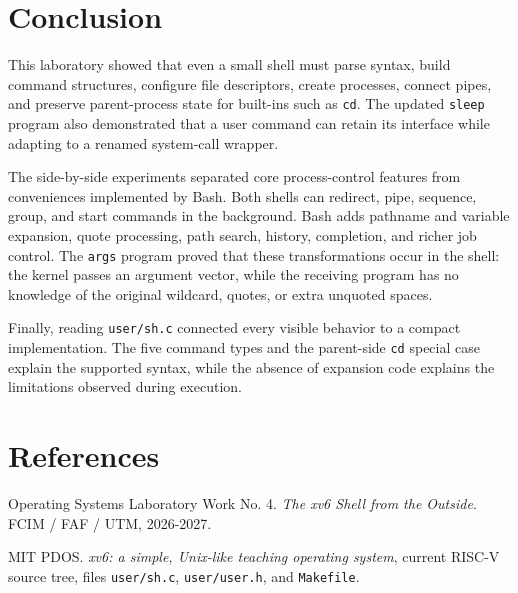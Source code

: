 \documentclass[12pt,a4paper]{article}
\begin{document}
\section*{Conclusion}

This laboratory showed that even a small shell must parse syntax, build command structures, configure file descriptors, create processes, connect pipes, and preserve parent-process state for built-ins such as \texttt{cd}. The updated \texttt{sleep} program also demonstrated that a user command can retain its interface while adapting to a renamed system-call wrapper.

The side-by-side experiments separated core process-control features from conveniences implemented by Bash. Both shells can redirect, pipe, sequence, group, and start commands in the background. Bash adds pathname and variable expansion, quote processing, path search, history, completion, and richer job control. The \texttt{args} program proved that these transformations occur in the shell: the kernel passes an argument vector, while the receiving program has no knowledge of the original wildcard, quotes, or extra unquoted spaces.

Finally, reading \texttt{user/sh.c} connected every visible behavior to a compact implementation. The five command types and the parent-side \texttt{cd} special case explain the supported syntax, while the absence of expansion code explains the limitations observed during execution.

\newpage
\section*{References}

\noindent[1] Operating Systems Laboratory Work No. 4. \textit{The xv6 Shell from the Outside}. FCIM / FAF / UTM, 2026-2027.

\vspace{0.6cm}
\noindent[2] MIT PDOS. \textit{xv6: a simple, Unix-like teaching operating system}, current RISC-V source tree, files \texttt{user/sh.c}, \texttt{user/user.h}, and \texttt{Makefile}.
\end{document}
